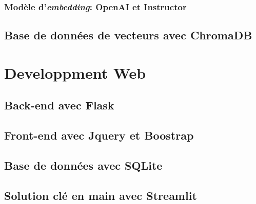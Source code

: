 \subsubsection{Modèle d'\textit{embedding}: OpenAI et Instructor}
\subsection{Base de données de vecteurs avec ChromaDB}
\section{Developpment Web}
\subsection{Back-end avec Flask}
\subsection{Front-end avec Jquery et Boostrap}
\subsection{Base de données avec SQLite}
\subsection{Solution clé en main avec Streamlit}
